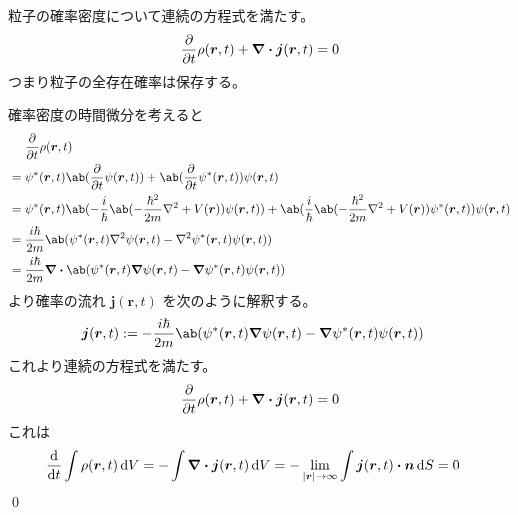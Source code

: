 \documentclass[uplatex,dvipdfmx,a4paper,11pt]{jlreq}
\makeatletter
\newcommand{\rr}{\bm{r}}
\numberwithin{equation}{section}
\theoremstyle{definition}
\renewenvironment{proof}[1][\proofname]{\par
  \normalfont
  \topsep6\p@\@plus6\p@ \trivlist
  \item[\hskip\labelsep{\bfseries #1}\@addpunct{\bfseries}]\ignorespaces\quad\par
}{%
  \qed\endtrivlist\@endpefalse
}
\renewcommand\proofname{証明}
\makeatother
\begin{document}
\begin{theorem}
  粒子の確率密度について連続の方程式を満たす。
  \begin{align}
    \diffp{}{t}\rho(\rr, t) + \vnabla\vdot\bm{j}(\rr, t) = 0
  \end{align}
  つまり粒子の全存在確率は保存する。
\end{theorem}
\begin{proof}
  確率密度の時間微分を考えると
  \begin{align}
     & \quad\ \diffp{}{t}\rho(\rr, t)                                                                                                                                                       \\
     & = \psi^*(\rr, t)\ab(\diffp{}{t}\psi(\rr, t)) + \ab(\diffp{}{t}\psi^*(\rr, t))\psi(\rr, t)                                                                                            \\
     & = \psi^*(\rr, t)\ab(-\frac{i}{\hbar}\ab(-\frac{\hbar^2}{2m}\nabla^2 + V(\rr))\psi(\rr, t)) + \ab(\frac{i}{\hbar}\ab(-\frac{\hbar^2}{2m}\nabla^2 + V(\rr))\psi^*(\rr, t))\psi(\rr, t) \\
     & = \frac{i\hbar}{2m}\ab(\psi^*(\rr, t)\nabla^2\psi(\rr, t) - \nabla^2\psi^*(\rr, t)\psi(\rr, t))                                                                                      \\
     & = \frac{i\hbar}{2m}\vnabla\vdot\ab(\psi^*(\rr, t)\vnabla\psi(\rr, t) - \vnabla\psi^*(\rr, t)\psi(\rr, t))
  \end{align}
  より確率の流れ $\bm{j}(\rr, t)$ を次のように解釈する。
  \begin{align}
    \bm{j}(\rr, t) & := -\frac{i\hbar}{2m}\ab(\psi^*(\rr, t)\vnabla\psi(\rr, t) - \vnabla\psi^*(\rr, t)\psi(\rr, t))
  \end{align}
  これより連続の方程式を満たす。
  \begin{align}
    \diffp{}{t}\rho(\rr, t) + \vnabla\vdot\bm{j}(\rr, t) = 0
  \end{align}
  これは
  \begin{align}
    \dv{t}\int\rho(\rr, t)\dl{V} & = -\int\vnabla\vdot\bm{j}(\rr, t)\dl{V} = -\lim_{|\rr|\to\infty}\int\bm{j}(\rr, t)\vdot\bm{n}\dl{S} = 0
  \end{align}
\end{proof}
\end{document}
